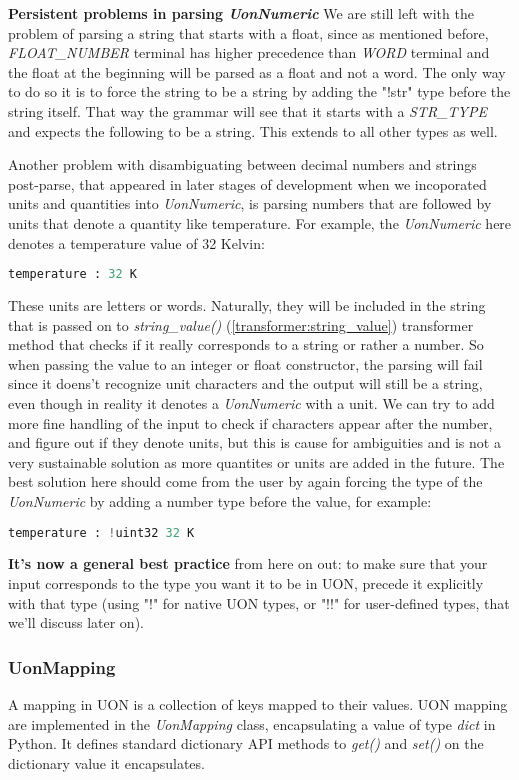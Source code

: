 \documentclass[12pt]{article}
\begin{document}
\textbf{Persistent problems in parsing \emph{UonNumeric}}
We are still left with the problem of parsing a string that starts with a float, since as mentioned before, \\ \emph{FLOAT\_NUMBER} terminal has higher precedence than \emph{WORD} terminal and the float at the beginning will be parsed as a float and not a word. The only way to do so it is to force the string to be a string by adding the "!str" type before the string itself. That way the grammar will see that it starts with a \emph{STR\_TYPE} and expects the following to be a string. This extends to all other types as well. 

Another problem with disambiguating between decimal numbers and strings post-parse, that appeared in later stages of development when we incoporated units and quantities into \emph{UonNumeric}, is parsing numbers that are followed by units that denote a quantity like temperature. For example, the \emph{UonNumeric} here denotes a temperature value of 32 Kelvin:
\begin{lstlisting}[language=Python]
temperature : 32 K
\end{lstlisting}
These units are letters or words. Naturally, they will be included in the string that is passed on to \emph{string\_value()} (\ref{transformer:string_value}) transformer method that checks if it really corresponds to a string or rather a number. So when passing the value to an integer or float constructor, the parsing will fail since it doens't recognize unit characters and the output will still be a string, even though in reality it denotes a \emph{UonNumeric} with a unit. We can try to add more fine handling of the input to check if characters appear after the number, and figure out if they denote units, but this is cause for ambiguities and is not a very sustainable solution as more quantites or units are added in the future. The best solution here should come from the user by again forcing the type of the \emph{UonNumeric} by adding a number type before the value, for example:
\begin{lstlisting}[language=Python]
temperature : !uint32 32 K
\end{lstlisting}

\textbf{It's now a general best practice} from here on out: to make sure that your input corresponds to the type you want it to be in UON, precede it explicitly with that type (using "!" for native UON types, or "!!" for user-defined types, that we'll discuss later on).

\subsubsection{UonMapping}
A mapping in UON is a collection of keys mapped to their values. UON mapping are implemented in the \emph{UonMapping} class, encapsulating a value of type \emph{dict} in Python. It defines standard dictionary API methods to \emph{get()} and \emph{set()} on the dictionary value it encapsulates.
 
\end{document}
